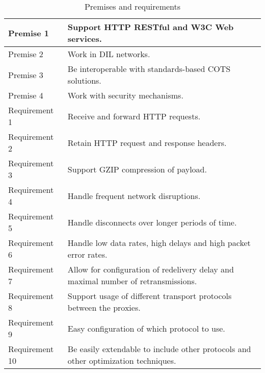 \begin{table}[h]
\centering

\begin{tabularx}{\textwidth}{|l|X|}
\hline
Premise 1     & Support HTTP RESTful and W3C Web services.                                         \\ \hline
Premise 2     & Work in DIL networks.                                                              \\ \hline
Premise 3     & Be interoperable with standards-based COTS solutions.                              \\ \hline
Premise 4     & Work with security mechanisms.                                                     \\ \hline
Requirement 1  & Receive and forward HTTP requests.                                                 \\ \hline
Requirement 2  & Retain HTTP request and response headers.                                          \\ \hline
Requirement 3  & Support GZIP compression of payload.                                               \\ \hline
Requirement 4  & Handle frequent network disruptions.                                               \\ \hline
Requirement 5  & Handle disconnects over longer periods of time.                                    \\ \hline
Requirement 6  & Handle low data rates, high delays and high packet error rates.                    \\ \hline
Requirement 7  & Allow for configuration of redelivery delay and maximal number of retransmissions. \\ \hline
Requirement 8  & Support usage of different transport protocols between the proxies.                \\ \hline
Requirement 9  & Easy configuration of which protocol to use.                                       \\ \hline
Requirement 10 & Be easily extendable to include other protocols and other optimization techniques. \\ \hline
\end{tabularx}
\caption{Premises and requirements}
\label{table-conclusion-requirements}
\end{table}

